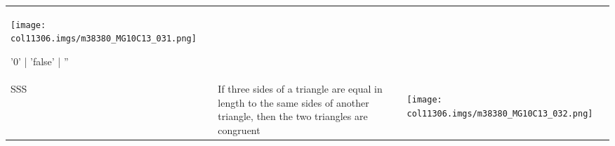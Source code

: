 \begin{table}[H]
\begin{center}
\begin{xtabular*}{\mytablewidth}[t]{|p{10\mystarwidth}|p{10\mystarwidth}|p{
10\mystarwidth}|}
    
        
                    
    \setcounter{subfigure}{0}

\label{m38380*id318071}
    \begin{center}
   
\label{m38380*id318071!!!underscore!!!media}\label{
m38380*id318071!!!underscore!!!printimage}\texttt{[image: 
col11306.imgs/m38380\_MG10C13\_031.png]} %
        
      \vspace{2pt}
    \vspace{.1in}
    
    \end{center}



    \addtocounter{footnote}{-0}
    
'0' | 'false' | ''
     \tabularnewline{}
    
    
        SSS &
    
    
        If three sides of a triangle are equal in length to the same sides of
another triangle, then the two triangles are congruent &
    
    
        
                    
    \setcounter{subfigure}{0}

\label{m38380*id318107}
    \begin{center}
   
\label{m38380*id318107!!!underscore!!!media}\label{
m38380*id318107!!!underscore!!!printimage}\texttt{[image: 
col11306.imgs/m38380\_MG10C13\_032.png]} %
        

\end{center}
\end{xtabular*}
\end{center}
\end{table}
